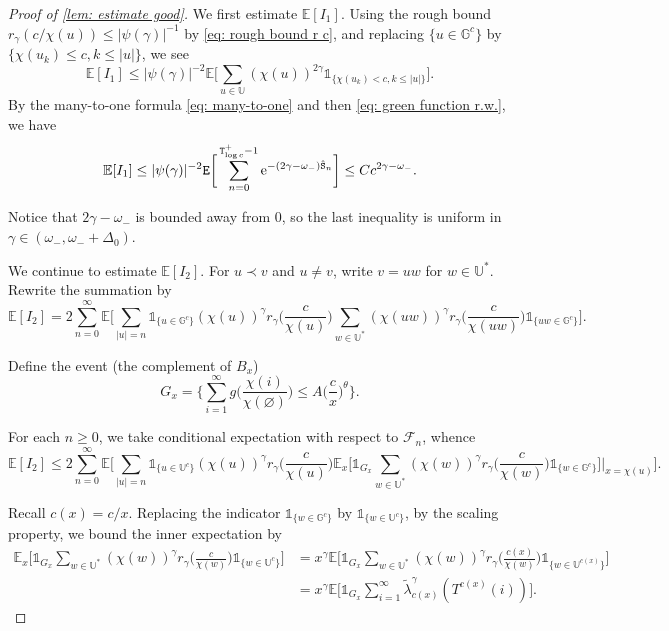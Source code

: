 \documentclass[12pt]{article}
\numberwithin{equation}{section}
\theoremstyle{plain}
\theoremstyle{definition}
\begin{document}
\begin{proof}[Proof of \cref{lem: estimate good}]
We first estimate $\mathbb{E}[I_1]$. Using the rough bound $r_{\gamma}(c/\chi(u))\le |\psi(\gamma)|^{-1}$ by \eqref{eq: rough bound r c}, and replacing $\{u\in\mathbb{G}^c\}$ by $\{\chi(u_k)\leq c, k\leq |u|\}$, we see
\[
\mathbb{E}[I_1] \leq |\psi(\gamma)|^{-2}\mathbb{E}\bigg[\sum_{u\in\mathbb{U}}(\chi(u))^{2\gamma}\mathds{1}_{\{\chi(u_k)<c, k\leq |u|\}}\bigg].
\]
By the many-to-one formula \eqref{eq: many-to-one} and then \eqref{eq: green function r.w.}, we have
\begin{equation}\label{eq: proof good I1 final}
\mathbb{E}[I_1] \leq |\psi(\gamma)|^{-2}{\tt E}\bigg[\sum^{{\tt T}_{\log c}^+-1}_{n=0} \mathrm{e}^{-(2\gamma-\omega_-){\hat{\tt S}}_n}\bigg]\leq Cc^{2\gamma-\omega_-}.
\end{equation}

\noindent Notice that $2\gamma-\omega_-$ is bounded away from $0$, so the last inequality is uniform in $\gamma\in(\omega_-, \omega_-+\Delta_0)$.

We continue to estimate $\mathbb{E}[I_2]$. For $u\prec v$ and $u\ne v$, write $v = uw$ for $w\in \mathbb{U}^*$. Rewrite the summation by
\[
\mathbb{E}[I_2] = 2\sum^{\infty}_{n=0}\mathbb{E}\bigg[\sum_{|u|=n}\mathds{1}_{\{u\in\mathbb{G}^c\}} (\chi(u))^{\gamma}r_{\gamma}\Big(\frac{c}{\chi(u)}\Big)\sum_{w\in\mathbb{U}^*} (\chi(uw))^{\gamma}r_{\gamma}\Big(\frac{c}{\chi(uw)}\Big)\mathds{1}_{\{uw\in\mathbb{G}^c\}}\bigg].
\]

\noindent Define the event (the complement of $B_x$)
\begin{equation}\label{eq: def G_x}
    G_x = \bigg\{\sum^{\infty}_{i=1} g\Big(\frac{\chi(i)}{\chi(\varnothing)}\Big)\leq A\Big(\frac{c}{x}\Big)^{\theta} \bigg\}.
\end{equation}

\noindent For each $n\geq 0$, we take conditional expectation with respect to $\mathcal{F}_n$, whence
\begin{equation}\label{eq: proof good I2 1}
\mathbb{E}[I_2] \le 2\sum^{\infty}_{n=0}\mathbb{E}\bigg[\sum_{|u|=n}\mathds{1}_{\{u\in\mathbb{U}^c\}} (\chi(u))^{\gamma}r_{\gamma}\Big(\frac{c}{\chi(u)}\Big)\mathbb{E}_x\Big[\mathds{1}_{G_x}\sum_{w\in\mathbb{U}^*} (\chi(w))^{\gamma}r_{\gamma}\Big(\frac{c}{\chi(w)}\Big)\mathds{1}_{\{w\in\mathbb{G}^{c}\}}\Big]\bigg|_{x=\chi(u)}\bigg].
\end{equation}

\noindent Recall $c(x)=c/x$. Replacing the indicator $\mathds{1}_{\{w\in\mathbb{G}^c\}}$ by $\mathds{1}_{\{w\in\mathbb{U}^c\}}$, by the scaling property, we bound the inner expectation by
\begin{align}  \mathbb{E}_x\bigg[\mathds{1}_{G_x}\sum_{w\in\mathbb{U}^*} (\chi(w))^{\gamma}r_{\gamma}\Big(\frac{c}{\chi(w)}\Big) \mathds{1}_{\{w\in\mathbb{U}^c\}}\bigg] &=x^{\gamma}\mathbb{E}\bigg[\mathds{1}_{G_x}\sum_{w\in\mathbb{U}^*} (\chi(w))^{\gamma}r_{\gamma}\Big(\frac{c(x)}{\chi(w)}\Big)\mathds{1}_{\{w\in\mathbb{U}^{c(x)}\}}\bigg]\nonumber \\
&=x^{\gamma}\mathbb{E}\bigg[\mathds{1}_{G_x}\sum^{\infty}_{i=1} \tilde{\lambda}^{\gamma}_{c(x)}(T^{c(x)}(i))\bigg]. \label{eq: proof good I2 2}
\end{align}


\end{proof}
\end{document}
